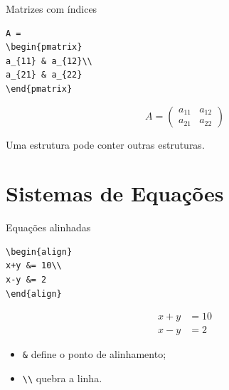 \documentclass[aspectratio=169,xcolor=dvipsnames]{beamer}
\begin{document}
\begin{frame}[fragile]{Matrizes com índices}

\begin{lstlisting}
A =
\begin{pmatrix}
a_{11} & a_{12}\\
a_{21} & a_{22}
\end{pmatrix}
\end{lstlisting}

    \[
        A=
        \begin{pmatrix}
            a_{11} & a_{12}\\
            a_{21} & a_{22}
        \end{pmatrix}
    \]

    \begin{center}
        Uma estrutura pode conter outras estruturas.
    \end{center}

\end{frame}

\section{Sistemas de Equações}

\begin{frame}[fragile]{Equações alinhadas}

\begin{lstlisting}
\begin{align}
x+y &= 10\\
x-y &= 2
\end{align}
\end{lstlisting}

    \[
        \begin{aligned}
            x+y &= 10\\
            x-y &= 2
        \end{aligned}
    \]

    \begin{itemize}
        \item \texttt{\&} define o ponto de alinhamento;
        \item \texttt{\textbackslash\textbackslash} quebra a linha.
    \end{itemize}

\end{frame}
\end{document}
